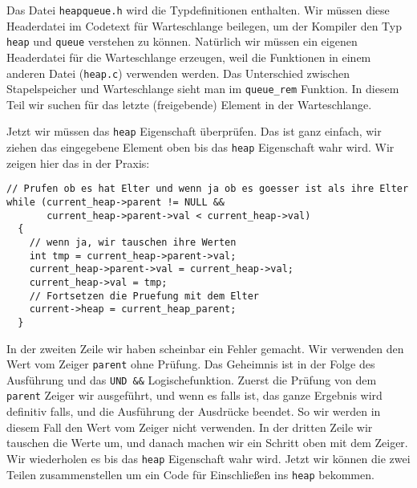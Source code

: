 Das Datei \texttt{heapqueue.h} wird die Typdefinitionen enthalten. Wir müssen
diese Headerdatei im Codetext für Warteschlange beilegen, um der Kompiler
den Typ \texttt{heap} und \texttt{queue} verstehen zu können. Natürlich wir müssen 
ein eigenen Headerdatei für die Warteschlange erzeugen, weil die Funktionen 
in einem anderen Datei (\texttt{heap.c}) verwenden werden. Das Unterschied
zwischen Stapelspeicher und Warteschlange sieht man im 
\texttt{queue\_rem} Funktion. In diesem Teil wir suchen für das letzte (freigebende) 
Element in der Warteschlange.

Jetzt wir müssen das \texttt{heap} Eigenschaft überprüfen. Das ist ganz einfach, 
wir ziehen das eingegebene Element oben bis das \texttt{heap} Eigenschaft wahr wird.
Wir zeigen hier das in der Praxis:
\begin{lstlisting}
// Prufen ob es hat Elter und wenn ja ob es goesser ist als ihre Elter
while (current_heap->parent != NULL &&
       current_heap->parent->val < current_heap->val)
  {
    // wenn ja, wir tauschen ihre Werten
    int tmp = current_heap->parent->val;
    current_heap->parent->val = current_heap->val;
    current_heap->val = tmp;
    // Fortsetzen die Pruefung mit dem Elter
    current->heap = current_heap_parent;
  }
\end{lstlisting}
In der zweiten Zeile wir haben scheinbar ein Fehler gemacht. Wir verwenden
den Wert vom Zeiger \texttt{parent} ohne Prüfung. 
Das Geheimnis ist in der
Folge des Ausführung und das \texttt{UND \&\&} Logischefunktion.
Zuerst die Prüfung von dem \texttt{parent} Zeiger wir ausgeführt, und wenn es falls ist, das
ganze Ergebnis wird definitiv falls, und die Ausführung der Ausdrücke beendet. 
So wir werden in diesem Fall den Wert vom Zeiger nicht verwenden.
In der dritten Zeile wir tauschen die Werte um, und danach machen
wir ein Schritt oben mit dem Zeiger. Wir wiederholen es bis
das \texttt{heap} Eigenschaft wahr wird. Jetzt wir können die zwei Teilen
zusammenstellen um ein Code für Einschließen ins \texttt{heap} bekommen.

